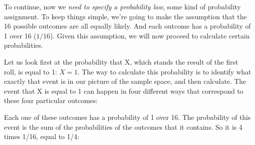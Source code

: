 \documentclass[pdftex, brazil, 12pt, twoside]{article}
\begin{document}
\begin{figure}[H]
  \begin{center}
  \end{center}
\end{figure}

To continue, now we \emph{need to specify a probability law},
some kind of probability assignment.
To keep things simple, we're going to make the assumption
that the 16 possible outcomes are all equally likely.
And each outcome has a probability of 1 over 16 ($1/16$).
Given this assumption, we will now proceed to calculate
certain probabilities.

Let us look first at the probability that X, which
stands the result of the first roll, is equal to 1: $X=1$.
The way to calculate this probability is to identify
what exactly that event is in our picture of the sample
space, and then calculate.
The event that X is equal to 1 can happen in four different
ways that correspond to these four particular outcomes:

\begin{figure}[H]
  \begin{center}
  \end{center}
\end{figure}

Each one of these outcomes has a probability of 1 over 16.
The probability of this event is the sum of the
probabilities of the outcomes that it contains.
So it is 4 times 1/16, equal to 1/4:
\end{document}
